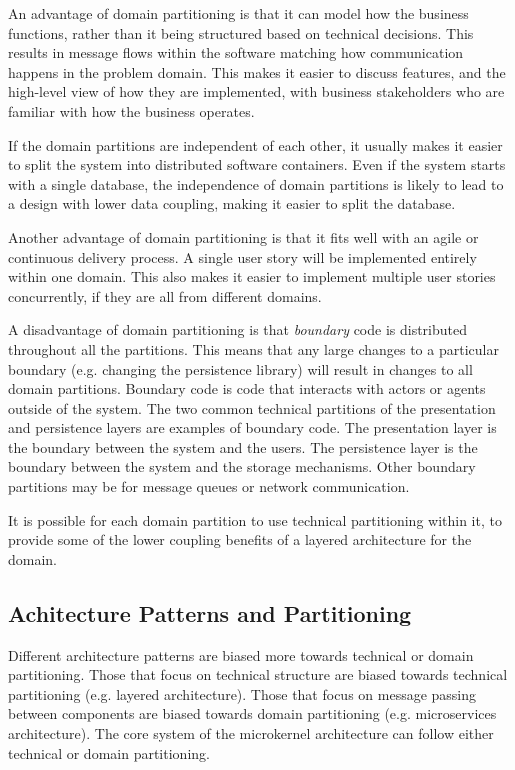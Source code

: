 An advantage of domain partitioning is that it can model how the business functions, rather than it being structured based on technical decisions.
This results in message flows within the software matching how communication happens in the problem domain.
This makes it easier to discuss features, and the high-level view of how they are implemented, with business stakeholders who are familiar with how the business operates.

If the domain partitions are independent of each other, it usually makes it easier to split the system into distributed software containers.
Even if the system starts with a single database, the independence of domain partitions is likely to lead to a design with lower data coupling,
making it easier to split the database.

Another advantage of domain partitioning is that it fits well with an agile or continuous delivery process.
A single user story will be implemented entirely within one domain.
This also makes it easier to implement multiple user stories concurrently, if they are all from different domains.

A disadvantage of domain partitioning is that \emph{boundary} code is distributed throughout all the partitions.
This means that any large changes to a particular boundary (e.g. changing the persistence library) will result in changes to all domain partitions.
Boundary code is code that interacts with actors or agents outside of the system.
The two common technical partitions of the presentation and persistence layers are examples of boundary code.
The presentation layer is the boundary between the system and the users.
The persistence layer is the boundary between the system and the storage mechanisms.
Other boundary partitions may be for message queues or network communication.

It is possible for each domain partition to use technical partitioning within it,
to provide some of the lower coupling benefits of a layered architecture for the domain.

\subsection{Achitecture Patterns and Partitioning}
Different architecture patterns are biased more towards technical or domain partitioning.
Those that focus on technical structure are biased towards technical partitioning (e.g. layered architecture).
Those that focus on message passing between components are biased towards domain partitioning (e.g. microservices architecture).
The core system of the microkernel architecture can follow either technical or domain partitioning.

